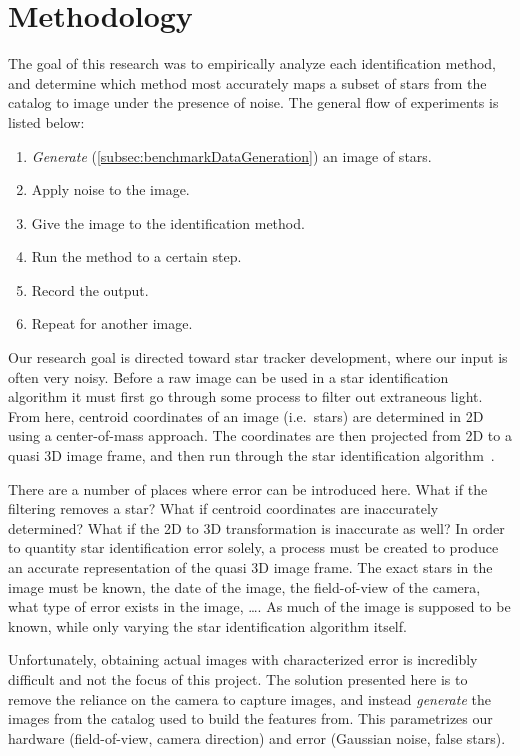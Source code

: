 \newcommand{\itmref}[2]{\hyperref[#2]{#1 Variable~\ref*{#2}}}

\section{Methodology}\label{sec:methodology}
The goal of this research was to empirically analyze each identification method, and determine which method most
accurately maps a subset of stars from the catalog to image under the presence of noise.
The general flow of experiments is listed below:
\begin{enumerate}
    \item \textit{Generate} (\autoref{subsec:benchmarkDataGeneration}) an image of stars.
    \item Apply noise to the image.
    \item Give the image to the identification method.
    \item Run the method to a certain step.
    \item Record the output.
    \item Repeat for another image.
\end{enumerate}

Our research goal is directed toward star tracker development, where our input is often very noisy.
Before a raw image can be used in a star identification algorithm it must first go through some process to filter out
extraneous light.
From here, centroid coordinates of an image (i.e.\ stars) are determined in 2D using a center-of-mass approach.
The coordinates are then projected from 2D to a quasi 3D image frame, and then run through the star identification
algorithm~\cite{spratling:surveyStarIdentification}.

There are a number of places where error can be introduced here.
What if the filtering removes a star?
What if centroid coordinates are inaccurately determined?
What if the 2D to 3D transformation is inaccurate as well?
In order to quantity star identification error solely, a process must be created to produce an accurate
representation of the quasi 3D image frame.
The exact stars in the image must be known, the date of the image, the field-of-view of the camera, what type of
error exists in the image, \ldots.
As much of the image is supposed to be known, while only varying the star identification algorithm itself.

Unfortunately, obtaining actual images with characterized error is incredibly difficult and not the focus of this
project.
The solution presented here is to remove the reliance on the camera to capture images, and instead
\textit{generate} the images from the catalog used to build the features from.
This parametrizes our hardware (field-of-view, camera direction) and error (Gaussian noise, false stars).

